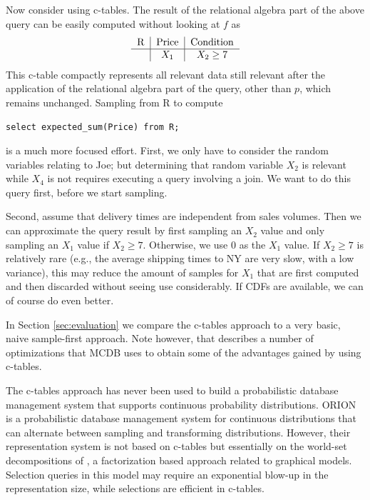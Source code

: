 \begin{example}
Now consider using c-tables. The result of the relational algebra part of the
above query can be easily computed without looking at $f$ as
\[
\begin{tabular}{c|c|c}
R & Price & Condition \\
\hline
& $X_1$ & $X_2 \ge 7$ \\
\end{tabular}
\]
This c-table compactly represents all relevant data still relevant after the
application of the relational algebra part of the query, other than $p$,
which remains unchanged.
Sampling from R to compute
\begin{verbatim}
select expected_sum(Price) from R;
\end{verbatim}
is a much more focused effort.
First, we only have to consider the random variables relating to Joe;
but determining that random variable $X_2$ is relevant while $X_4$
is not requires
executing a query involving a join. We want to do this query first, before
we start sampling.

Second, assume that delivery times are
independent from sales volumes. Then we can approximate the
query result
by first sampling an $X_2$ value and only sampling an $X_1$ value if $X_2 \ge 7$.
Otherwise, we use $0$ as the $X_1$ value.
If $X_2 \ge 7$ is relatively rare (e.g., the average shipping times to NY are
very slow, with a low variance), this may reduce the amount of samples
for $X_1$ that are first computed and then discarded without seeing use
considerably.
If CDFs are available, we can of course do even better.

In Section \ref{sec:evaluation} we compare the c-tables approach to a very basic, 
naive sample-first approach.  Note however, that \cite{MCDB} describes a number of 
optimizations that MCDB uses to obtain some of the advantages gained by using c-tables.
%
\punto
\end{example}


The  c-tables  approach has  never  been used  to build  a
probabilistic  database  management  system that  supports  continuous
probability  distributions.
%
ORION \cite{ORION} is a probabilistic database management system for
continuous distributions that can alternate between sampling
and transforming distributions. However, their representation
system is not based on c-tables but essentially on the
world-set decompositions of \cite{AKO07WSD}, a factorization
based approach related to graphical models.
Selection queries in this model may require an exponential blow-up in the
representation size, while selections are efficient in c-tables.


